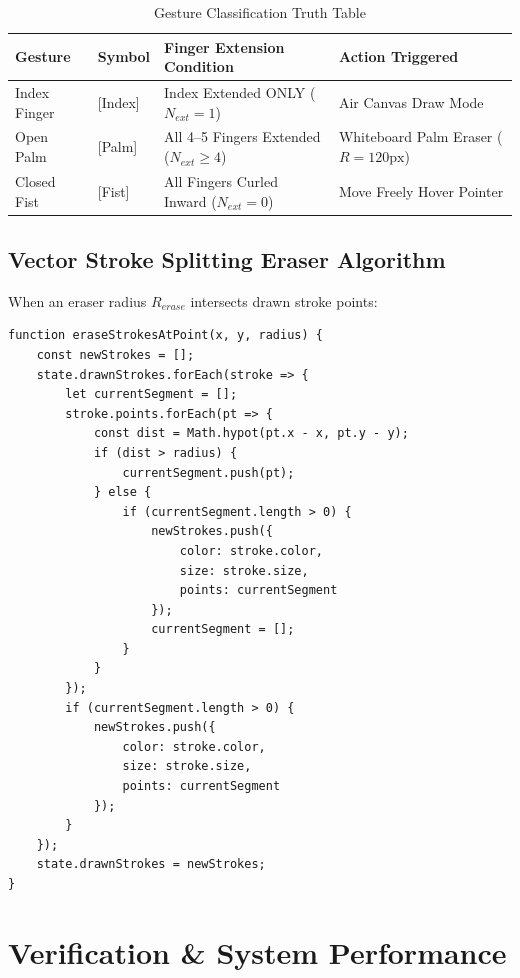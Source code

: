 \documentclass[11pt,a4paper]{article}
\begin{document}
\begin{table}[h]
\centering
\caption{Gesture Classification Truth Table}
\vspace{2mm}
\begin{tabular}{@{}llp{6.5cm}l@{}}
\toprule
\textbf{Gesture} & \textbf{Symbol} & \textbf{Finger Extension Condition} & \textbf{Action Triggered} \\ \midrule
Index Finger & [Index] & Index Extended ONLY ($N_{ext} = 1$) & Air Canvas Draw Mode \\
Open Palm & [Palm] & All 4--5 Fingers Extended ($N_{ext} \ge 4$) & Whiteboard Palm Eraser ($R=120\text{px}$) \\
Closed Fist & [Fist] & All Fingers Curled Inward ($N_{ext} = 0$) & Move Freely Hover Pointer \\ \bottomrule
\end{tabular}
\end{table}

\subsection{Vector Stroke Splitting Eraser Algorithm}
When an eraser radius $R_{erase}$ intersects drawn stroke points:

\begin{lstlisting}
function eraseStrokesAtPoint(x, y, radius) {
    const newStrokes = [];
    state.drawnStrokes.forEach(stroke => {
        let currentSegment = [];
        stroke.points.forEach(pt => {
            const dist = Math.hypot(pt.x - x, pt.y - y);
            if (dist > radius) {
                currentSegment.push(pt);
            } else {
                if (currentSegment.length > 0) {
                    newStrokes.push({
                        color: stroke.color,
                        size: stroke.size,
                        points: currentSegment
                    });
                    currentSegment = [];
                }
            }
        });
        if (currentSegment.length > 0) {
            newStrokes.push({
                color: stroke.color,
                size: stroke.size,
                points: currentSegment
            });
        }
    });
    state.drawnStrokes = newStrokes;
}
\end{lstlisting}

\section{Verification \& System Performance}
\end{document}
